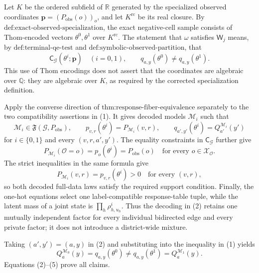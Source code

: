 Let \(K\) be the ordered subfield of \(\mathbb R\) generated by the specialized observed coordinates \(\mathbf p=(P_{\mathrm{obs}}(o))_o\), and let \(K^{\mathrm{rc}}\) be its real closure. By \(\text{def:exact-observed-specialization}\), the exact negative-cell sample consists of Thom-encoded vectors \(\theta^0,\theta^1\) over \(K^{\mathrm{rc}}\). The statement that \(\omega\) satisfies \(\mathsf W_j\) means, by \(\text{def:terminal-qe-test}\) and \(\text{def:symbolic-observed-partition}\), that
\[
\mathsf C_{\mathcal G}(\theta^i;\mathbf p)\quad(i=0,1),
\qquad
q_{a,y}(\theta^0)\neq q_{a,y}(\theta^1).
\tag{1}
\]
This use of Thom encodings does not assert that the coordinates are algebraic over \(\mathbb Q\): they are algebraic over \(K\), as required by the corrected specialization definition.

Apply the converse direction of \(\text{thm:response-fiber-equivalence}\) separately to the two compatibility assertions in (1). It gives decoded models \(\mathcal M_i\) such that
\[
\mathcal M_i\in\mathfrak F(\mathcal G,P_{\mathrm{obs}}),
\qquad
p_{v,r}(\theta^i)=P_{\mathcal M_i}(v,r),
\qquad
q_{a',y'}(\theta^i)=Q_{a'}^{\mathcal M_i}(y')
\tag{2}
\]
for \(i\in\{0,1\}\) and every \((v,r,a',y')\). The equality constraints in \(\mathsf C_{\mathcal G}\) further give
\[
P_{\mathcal M_i}(\mathcal O=o)=p_o(\theta^i)=P_{\mathrm{obs}}(o)
\quad\text{for every }o\in\mathcal X_{\mathcal O}.
\tag{3}
\]
The strict inequalities in the same formula give
\[
P_{\mathcal M_i}(v,r)=p_{v,r}(\theta^i)>0
\quad\text{for every }(v,r),
\tag{4}
\]
so both decoded full-data laws satisfy the required support condition. Finally, the one-hot equations select one label-compatible response-table tuple, while the latent mass of a joint state is \(\prod_h\rho^i_{h,u_h}\). Thus the decoding in (2) retains one mutually independent factor for every individual bidirected edge and every private factor; it does not introduce a district-wide mixture.

Taking \((a',y')=(a,y)\) in (2) and substituting into the inequality in (1) yields
\[
Q_a^{\mathcal M_0}(y)=q_{a,y}(\theta^0)\neq q_{a,y}(\theta^1)=Q_a^{\mathcal M_1}(y).
\tag{5}
\]
Equations (2)--(5) prove all claims.